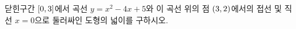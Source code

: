 닫힌구간 $[0{,}\mkern3mu\mathopen{}3]$에서 곡선 $y=x^2-4x+5$와 이 곡선 위의 점 $(3{,}\mkern3mu\mathopen{}2)$에서의 접선 및 직선 $x=0$으로 둘러싸인 도형의 넓이를 구하시오.
